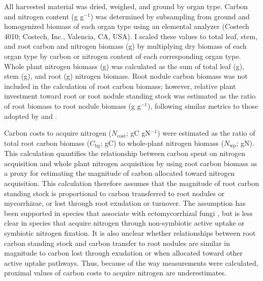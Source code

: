 All harvested material was dried, weighed, and ground by organ type. Carbon and nitrogen content (g g$^{-1}$) was determined by subsampling from ground and homogenized biomass of each organ type using an elemental analyzer (Costech 4010; Costech, Inc., Valencia, CA, USA). I scaled these values to total leaf, stem, and root carbon and nitrogen biomass (g) by multiplying dry biomass of each organ type by carbon or nitrogen content of each corresponding organ type. Whole plant nitrogen biomass (g) was calculated as the sum of total leaf (g), stem (g), and root (g) nitrogen biomass. Root nodule carbon biomass was not included in the calculation of root carbon biomass; however, relative plant investment toward root or root nodule standing stock was estimated as the ratio of root biomass to root nodule biomass (g g$^{-1}$), following similar metrics to those adopted by  and .

Carbon costs to acquire nitrogen ($N_\mathrm{cost}$; gC gN$^{-1}$) were estimated as the ratio of total root carbon biomass ($C_\mathrm{bg}$; gC) to whole-plant nitrogen biomass ($N_\mathrm{wp}$; gN). This calculation quantifies the relationship between carbon spent on nitrogen acquisition and whole plant nitrogen acquisition by using root carbon biomass as a proxy for estimating the magnitude of carbon allocated toward nitrogen acquisition. This calculation therefore assumes that the magnitude of root carbon standing stock is proportional to carbon transferred to root nodules or mycorrhizae, or lost through root exudation or turnover. The assumption has been supported in species that associate with ectomycorrhizal fungi , but is less clear in species that acquire nitrogen through non-symbiotic active uptake or symbiotic nitrogen fixation. It is also unclear whether relationships between root carbon standing stock and carbon transfer to root nodules are similar in magnitude to carbon lost through exudation or when allocated toward other active uptake pathways. Thus, because of the way measurements were calculated, proximal values of carbon costs to acquire nitrogen are underestimates.

